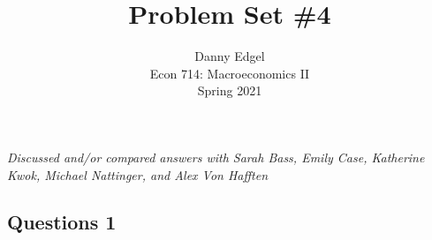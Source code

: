 \documentclass{article}
\begin{document}
\title{	Problem Set \#4 }
\author{ 	Danny Edgel 					\\ 
			Econ 714: Macroeconomics II		\\
			Spring 2021						\\
		}
\maketitle\thispagestyle{empty}


\noindent\textit{Discussed and/or compared answers with Sarah Bass, Emily Case, Katherine Kwok, Michael Nattinger, and Alex Von Hafften}
\medskip \\


\subsection*{Questions 1}
\end{document}
